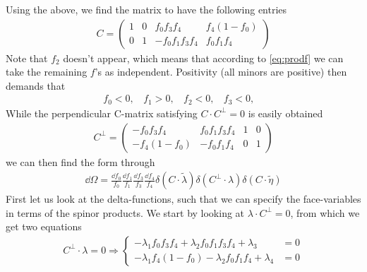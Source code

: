 \documentclass[letter,11pt]{article}
\begin{document}
Using the above, we find the matrix to have the following entries
\begin{equation}
	\begin{aligned}
		C=
		\begin{pmatrix}
			1 & 0 & f_0f_3f_4 & f_4(1-f_0)\\
			0 & 1 & -f_0f_1f_3f_4&f_0f_1f_4
		\end{pmatrix}
	\end{aligned}
\end{equation}
Note that $f_2$ doesn't appear, which means that according to \eqref{eq:prodf} we can take the remaining $f$'s as independent. Positivity (all minors are positive) then demands that
\begin{equation}
	\begin{aligned}
		f_0<0,~~~~f_1>0,~~~~f_2<0,~~~~f_3<0,~~~~
	\end{aligned}
\end{equation}
While the perpendicular C-matrix satisfying $C\cdot C^\perp=0$ is easily obtained
\begin{equation}
	\begin{aligned}
		C^\perp=
		\begin{pmatrix}
		 -f_0f_3f_4 &f_0f_1f_3f_4 & 1 & 0\\
		-f_4(1-f_0) &-f_0f_1f_4 & 0 & 1
		\end{pmatrix}
	\end{aligned}
\end{equation}
we can then find the form through
\begin{equation}
	\begin{aligned}
		\dd \Omega =\frac{\dd f_0}{f_0}\frac{\dd f_1}{f_1}\frac{\dd f_3}{f_3}\frac{\dd f_4}{f_4}\delta(C\cdot \tilde \lambda) \delta(C^\perp\cdot \lambda)\delta(C\cdot \tilde \eta)
	\end{aligned}
\end{equation}
First let us look at the delta-functions, such that we can specify the face-variables in terms of the spinor products. We start by looking at $\lambda \cdot C^\perp=0$, from which we get two equations
\begin{equation}
	\begin{aligned}
		C^\perp\cdot \lambda=0\Rightarrow\begin{cases}
			-\lambda_1f_0f_3f_4+\lambda_2 f_0f_1f_3f_4+ \lambda_3&=0\\
			-\lambda_1f_4(1-f_0)-\lambda_2f_0f_1f_4+ \lambda_4&=0
		\end{cases}
	\end{aligned}
\end{equation}
\end{document}
